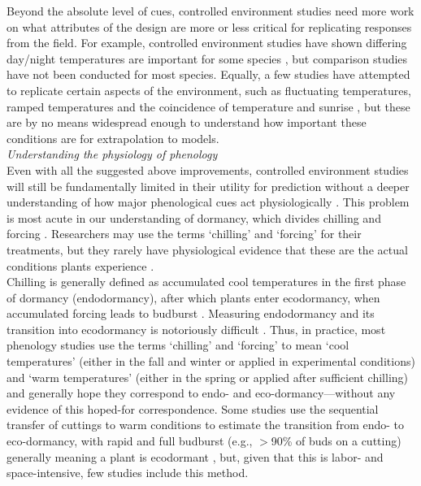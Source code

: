 \documentclass[11pt,letter]{article}
\begin{document}
Beyond the absolute level of cues, controlled environment studies need more work on what attributes of the design are more or less critical for replicating responses from the field. For example, controlled environment studies have shown differing day/night temperatures are important for some species \citep{heuvelink1989influence,abrol1996effects,Thingnaes2003,pressman2006exposing}, but comparison studies have not been conducted for most species. Equally, a few studies have attempted to replicate certain aspects of the environment, such as fluctuating temperatures, ramped temperatures and the coincidence of temperature and sunrise \citep{erwin1998}, but these are by no means widespread enough to understand how important these conditions are for extrapolation to models. \\

\emph{Understanding the physiology of phenology}\\
Even with all the suggested above improvements, controlled environment studies will still be fundamentally limited in their utility for prediction without a deeper understanding of how major phenological cues act physiologically \citep{Bahuguna2015}. This problem is most acute in our understanding of dormancy, which divides chilling and forcing \citep{singh2019,chang2021}. Researchers may use the terms `chilling' and `forcing' for their treatments, but they rarely have physiological evidence that these are the actual conditions plants experience \citep[][]{chuine2016}. \\

Chilling is generally defined as accumulated cool temperatures in the first phase of dormancy (endodormancy), after which plants enter ecodormancy, when accumulated forcing leads to budburst \citep{chuine2016}. Measuring endodormancy and its transition into ecodormancy is notoriously difficult  \citep[e.g.,][]{Junttila:2012aa}. Thus, in practice, most phenology studies use the terms `chilling' and `forcing' to mean `cool temperatures' (either in the fall and winter or applied in experimental conditions) and `warm temperatures' (either in the spring or applied after sufficient chilling) and generally hope they correspond to endo- and eco-dormancy---without any evidence of this hoped-for correspondence. Some studies use the sequential transfer of cuttings to warm conditions to estimate the transition from endo- to eco-dormancy, with rapid and full budburst (e.g., $>$90\% of buds on a cutting) generally meaning a plant is ecodormant \citep[e.g.,][]{Junttila:2012aa}, but, given that this is labor- and space-intensive, few studies include this method.\\
\end{document}
